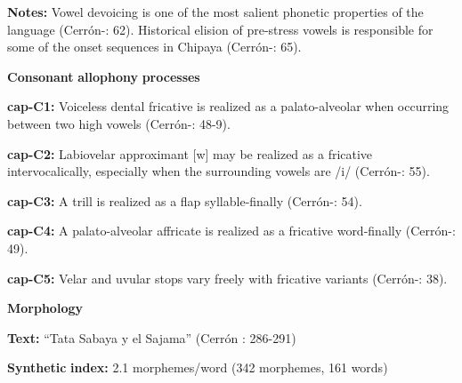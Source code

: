 \documentclass[output=paper]{langsci/langscibook}
\begin{document}
\begin{styleBody}
\textbf{Notes:} Vowel devoicing is one of the most salient phonetic properties of the language (Cerrón-\citealt{Palomino2006}: 62). Historical elision of pre-stress vowels is responsible for some of the onset sequences in Chipaya (Cerrón-\citealt{Palomino2006}: 65).
\end{styleBody}

\begin{styleBody}
\textbf{Consonant} \textbf{allophony} \textbf{processes}
\end{styleBody}

\begin{styleBody}
\textbf{cap-C1:} Voiceless dental fricative is realized as a palato-alveolar when occurring between two high vowels (Cerrón-\citealt{Palomino2006}: 48-9).
\end{styleBody}

\begin{styleBody}
\textbf{cap-C2:} Labiovelar approximant [w] may be realized as a fricative intervocalically, especially when the surrounding vowels are /i/ (Cerrón-\citealt{Palomino2006}: 55).
\end{styleBody}

\begin{styleBody}
\textbf{cap-C3:} A trill is realized as a flap syllable-finally (Cerrón-\citealt{Palomino2006}: 54).
\end{styleBody}

\begin{styleBody}
\textbf{cap-C4:} A palato-alveolar affricate is realized as a fricative word-finally (Cerrón-\citealt{Palomino2006}: 49).
\end{styleBody}

\begin{styleBody}
\textbf{cap-C5:} Velar and uvular stops vary freely with fricative variants (Cerrón-\citealt{Palomino2006}: 38).
\end{styleBody}

\begin{styleBody}
\textbf{Morphology}
\end{styleBody}

\begin{styleBody}
\textbf{Text:} “Tata Sabaya y el Sajama” (Cerrón \citealt{Palomino2006}: 286-291)
\end{styleBody}

\begin{styleBody}
\textbf{Synthetic} \textbf{index:} 2.1 morphemes/word (342 morphemes, 161 words)
\end{styleBody}
\end{document}
